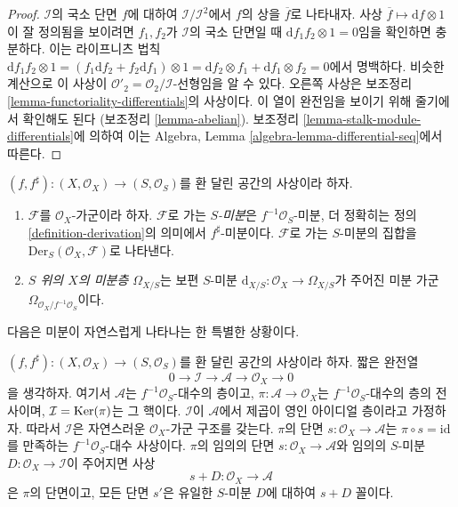 \begin{proof}
$\mathcal{I}$의 국소 단면 $f$에 대하여
$\mathcal{I}/\mathcal{I}^2$에서 $f$의 상을
$\overline{f}$로 나타내자. 사상
$\overline{f} \mapsto \text{d}f \otimes 1$이 잘 정의됨을 보이려면
$f_1, f_2$가 $\mathcal{I}$의 국소 단면일 때
$\text{d} f_1f_2 \otimes 1 = 0$임을 확인하면 충분하다.
이는 라이프니츠 법칙
$\text{d} f_1f_2 \otimes 1 =
(f_1 \text{d}f_2 + f_2 \text{d} f_1 )\otimes 1 =
\text{d}f_2 \otimes f_1 + \text{d}f_1 \otimes f_2 = 0$에서 명백하다.
비슷한 계산으로 이 사상이
$\mathcal{O}'_2 = \mathcal{O}_2/\mathcal{I}$-선형임을 알 수 있다.
오른쪽 사상은 보조정리 \ref{lemma-functoriality-differentials}의
사상이다. 이 열이 완전임을 보이기 위해 줄기에서 확인해도 된다
(보조정리 \ref{lemma-abelian}). 보조정리
\ref{lemma-stalk-module-differentials}에 의하여 이는
Algebra, Lemma \ref{algebra-lemma-differential-seq}에서 따른다.
\end{proof}

\begin{definition}
\label{definition-differentials}
$(f, f^\sharp) : (X, \mathcal{O}_X) \to (S, \mathcal{O}_S)$를
환 달린 공간의 사상이라 하자.
\begin{enumerate}
\item $\mathcal{F}$를 $\mathcal{O}_X$-가군이라 하자.
$\mathcal{F}$로 가는 {\it $S$-미분}은 $f^{-1}\mathcal{O}_S$-미분,
더 정확히는 정의 \ref{definition-derivation}의 의미에서
$f^\sharp$-미분이다. $\mathcal{F}$로 가는 $S$-미분의 집합을
$\text{Der}_S(\mathcal{O}_X, \mathcal{F})$로 나타낸다.
\item {\it $S$ 위의 $X$의 미분층 $\Omega_{X/S}$}는 보편
$S$-미분 $\text{d}_{X/S} : \mathcal{O}_X \to \Omega_{X/S}$가
주어진 미분 가군 $\Omega_{\mathcal{O}_X/f^{-1}\mathcal{O}_S}$이다.
\end{enumerate}
\end{definition}

\noindent
다음은 미분이 자연스럽게 나타나는 한 특별한 상황이다.

\begin{lemma}
\label{lemma-double-structure-gives-derivation}
$(f, f^\sharp) : (X, \mathcal{O}_X) \to (S, \mathcal{O}_S)$를
환 달린 공간의 사상이라 하자. 짧은 완전열
$$
0 \to \mathcal{I} \to \mathcal{A} \to \mathcal{O}_X \to 0
$$
을 생각하자. 여기서 $\mathcal{A}$는 $f^{-1}\mathcal{O}_S$-대수의
층이고, $\pi : \mathcal{A} \to \mathcal{O}_X$는
$f^{-1}\mathcal{O}_S$-대수의 층의 전사이며,
$\mathcal{I} = \mathop{\mathrm{Ker}}(\pi)$는 그 핵이다. $\mathcal{I}$이
$\mathcal{A}$에서 제곱이 영인 아이디얼 층이라고 가정하자.
따라서 $\mathcal{I}$은 자연스러운 $\mathcal{O}_X$-가군 구조를 갖는다.
$\pi$의 단면 $s : \mathcal{O}_X \to \mathcal{A}$는
$\pi \circ s = \text{id}$를 만족하는 $f^{-1}\mathcal{O}_S$-대수
사상이다. $\pi$의 임의의 단면
$s : \mathcal{O}_X \to \mathcal{A}$와 임의의 $S$-미분
$D : \mathcal{O}_X \to \mathcal{I}$이 주어지면 사상
$$
s + D : \mathcal{O}_X \to \mathcal{A}
$$
은 $\pi$의 단면이고, 모든 단면 $s'$은 유일한 $S$-미분 $D$에 대하여
$s + D$ 꼴이다.
\end{lemma}

